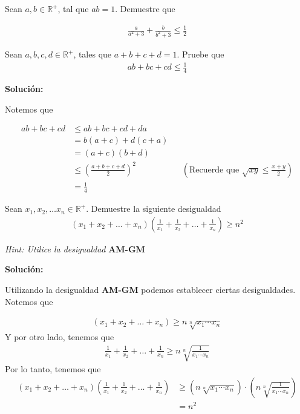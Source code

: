 \documentclass[12pt]{book}
\begin{document}
\begin{prob}{}{}
    Sean $a,b \in \mathbb{R}^+$, tal que $ab=1$. Demuestre que 

    \begin{align*}
        \frac{a}{a^2+3}+\frac{b}{b^2+3}\leq \frac{1}{2}
    \end{align*}
\end{prob}

\begin{prob}{}{}
Sean $a,b,c,d \in \mathbb{R}^+$, tales que $a+b+c+d=1$. Pruebe que 
\begin{align*}
    ab+bc+cd \leq \frac{1}{4}
\end{align*}
\end{prob}
\textbf{Solución:}

Notemos que 

\begin{align*}
      ab+bc+cd&\leq ab+bc+cd+da \\
      &=b(a+c)+d(c+a) \\
      &=(a+c)(b+d) \\
      &\leq \left( \frac{a+b+c+d}{2} \right)^2 && \left(\text{Recuerde que } \sqrt{xy} \leq \frac{x+y}{2}\right)\\
      &=\frac{1}{4}
\end{align*}

\begin{prob}
    \quad \quad 
    Sean $x_1,x_2, \ldots x_n \in \mathbb{R}^+$. Demuestre la siguiente desigualdad 
 \begin{align*}
     (x_1+x_2+\dots +x_n)\left(\frac{1}{x_1}+\frac{1}{x_2}+\dots + \frac{1}{x_n}\right) \geq n^2
 \end{align*}

    \emph{Hint: Utilice la desigualdad} \textbf{AM-GM}
 
\end{prob}
\textbf{Solución:}

Utilizando la desigualdad \textbf{AM-GM} podemos establecer ciertas desigualdades. Notemos que 

\begin{align*}
    (x_1+x_2+\dots +x_n) \geq n \sqrt[n]{x_1 \cdots x_n}
\end{align*}
Y por otro lado, tenemos que 
\begin{align*}
    \frac{1}{x_1}+\frac{1}{x_2}+\dots + \frac{1}{x_n} \geq n \sqrt[n]{\frac{1}{x_1 \cdots x_n}}
\end{align*}
Por lo tanto, tenemos que 
\begin{align*}
     (x_1+x_2+\dots +x_n)\left(\frac{1}{x_1}+\frac{1}{x_2}+\dots + \frac{1}{x_n}\right) &\geq \left(n \sqrt[n]{x_1 \cdots x_n}\right)\cdot\left(n \sqrt[n]{\frac{1}{x_1 \cdots x_n}}\right) \\
     &=n^2
\end{align*}
\end{document}
